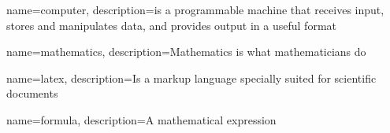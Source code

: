 {
  name=computer,
  description={is a programmable machine that receives input,
               stores and manipulates data, and provides
               output in a useful format}
}

{
    name=mathematics,
    description={Mathematics is what mathematicians do}
}

{
    name=latex,
    description={Is a markup language specially suited for 
scientific documents}
}


{
    name=formula,
    description={A mathematical expression}
}
